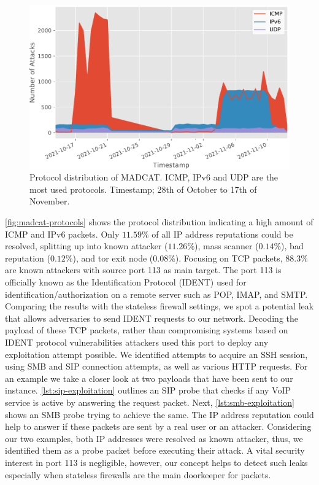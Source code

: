 \begin{figure}[ht]
    \centering
    \includegraphics[width=\textwidth]{figures/madcat-protocol-usage.pdf}
    \caption[Protocol distribution of MADCAT]{Protocol distribution of MADCAT. ICMP, IPv6 and UDP are the most used protocols. Timestamp; 28th of October to 17th of November.}
    \label{fig:madcat-protocols}
\end{figure}

\autoref{fig:madcat-protocols} shows the protocol distribution indicating a high amount of ICMP and IPv6 packets.
Only $11.59\%$ of all IP address reputations could be resolved, splitting up into known attacker ($11.26\%$), mass scanner ($0.14\%$), bad reputation ($0.12\%$), and tor exit node ($0.08\%$).
Focusing on TCP packets, $88.3\%$ are known attackers with source port 113 as main target.
The port 113 is officially known as the Identification Protocol (IDENT)\cite{rfc1413} used for identification/authorization on a remote server such as POP, IMAP, and SMTP.
Comparing the results with the stateless firewall settings, we spot a potential leak that allows adversaries to send IDENT requests to our network.
Decoding the payload of these TCP packets, rather than compromising systems based on IDENT protocol vulnerabilities attackers used this port to deploy any exploitation attempt possible.
We identified attempts to acquire an SSH session, using SMB and SIP connection attempts, as well as various HTTP requests.
For an example we take a closer look at two payloads that have been sent to our instance.
\autoref{lst:sip-exploitation} outlines an SIP probe that checks if any VoIP service is active by answering the request packet.
Next, \autoref{lst:smb-exploitation} shows an SMB probe trying to achieve the same.
The IP address reputation could help to answer if these packets are sent by a real user or an attacker.
Considering our two examples, both IP addresses were resolved as known attacker, thus, we identified them as a probe packet before executing their attack.
A vital security interest in port 113 is negligible, however, our concept helps to detect such leaks especially when stateless firewalls are the main doorkeeper for packets.

